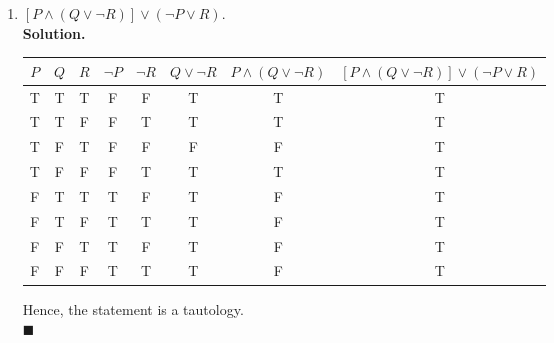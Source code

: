 \documentclass{report}
\newcommand{\sol}{\vspace{1em}\\\textbf{Solution.}\vspace{0.5em}}
\newcommand{\qed}{‎\\‎\hfill$\blacksquare$\vspace{1em}}
\begin{document}
\begin{enumerate}[leftmargin=*]
\begin{enumerate}
              \item $[P \wedge(Q \vee \neg R)] \vee(\neg P \vee R)$.
                    \sol{}
                    \begin{center}
                        \begin{tabular}{cccccccc}
                            $P$ & $Q$ & $R$ & $\neg P$ & $\neg R$ & $Q \vee \neg R$ & $P \wedge(Q \vee \neg R)$ & $[P \wedge(Q \vee \neg R)] \vee(\neg P \vee R)$ \\
                            \hline
                            T   & T   & T   & F        & F        & T               & T                         & T                                               \\
                            T   & T   & F   & F        & T        & T               & T                         & T                                               \\
                            T   & F   & T   & F        & F        & F               & F                         & T                                               \\
                            T   & F   & F   & F        & T        & T               & T                         & T                                               \\
                            F   & T   & T   & T        & F        & T               & F                         & T                                               \\
                            F   & T   & F   & T        & T        & T               & F                         & T                                               \\
                            F   & F   & T   & T        & F        & T               & F                         & T                                               \\
                            F   & F   & F   & T        & T        & T               & F                         & T
                        \end{tabular}
                    \end{center}
                    Hence, the statement is a tautology.\qed
          \end{enumerate}


\end{enumerate}
\end{document}
